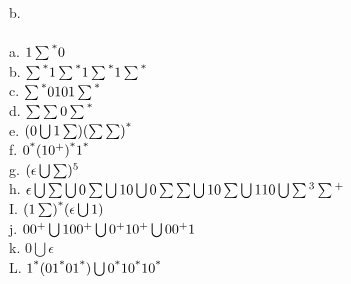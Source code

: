\documentclass[12pt]{article}
\begin{document}
b. \\


 \\

a. $1\sum\textsuperscript{*}0$ \\

b. $\sum\textsuperscript{*}1\sum\textsuperscript{*}1\sum\textsuperscript{*}1\sum\textsuperscript{*}$ \\

c. $\sum\textsuperscript{*}0101\sum\textsuperscript{*}$ \\

d. $\sum\sum0\sum\textsuperscript{*}$ \\

e. $(0\bigcup1\sum)(\sum\sum)\textsuperscript{*}$ \\

f. $0\textsuperscript{*}(10\textsuperscript{+})\textsuperscript{*}1\textsuperscript{*}$ \\

g. $(\epsilon\bigcup\sum)\textsuperscript{5}$ \\

h. $\epsilon \bigcup \sum \bigcup 0 \sum \bigcup 10 \bigcup 0 \sum\sum \bigcup 10\sum \bigcup 110 \bigcup \sum \textsuperscript{3} \sum \textsuperscript{+} $ \\

I. $(1 \sum) \textsuperscript{*}(\epsilon \bigcup 1) $ \\

j. $00 \textsuperscript{+} \bigcup 100 \textsuperscript{+} \bigcup 0 \textsuperscript{+}
    10 \textsuperscript{+} \bigcup 00 \textsuperscript{+} 1 $ \\

k. $ 0 \bigcup \epsilon $ \\

L. $ 1 \textsuperscript{*} (01\textsuperscript{*}01\textsuperscript{*}) \bigcup 0 
     \textsuperscript{*} 10 \textsuperscript{*} 10 \textsuperscript{*} $ \\
\end{document}
